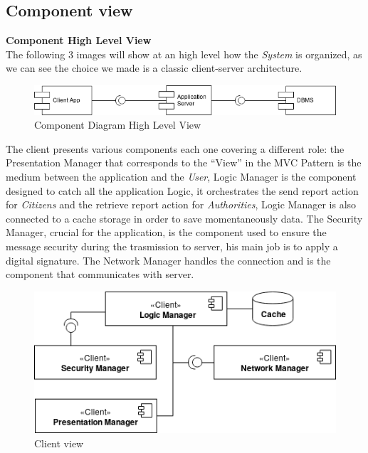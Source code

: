 \documentclass{article}
\begin{document}
\clearpage
\subsection{Component view}
\textbf{Component High Level View} \\
The following 3 images will show at an high level how the \textit{System} is organized, as we can see the
choice we made is a classic client-server architecture. 

\begin{figure}[H]
    \centering
    \includegraphics[scale=0.4]{img/component_diagrams/component_diagram.png}
    \caption{Component Diagram High Level View}
\end{figure}
The client presents various components 
each one covering a different role: the Presentation Manager that corresponds to the “View” in the MVC Pattern 
is the medium between the application and the \textit{User}, Logic Manager is the component designed to catch 
all the application Logic, it orchestrates the send report action for \textit{Citizens} and the retrieve report 
action for \textit{Authorities}, Logic Manager is also connected to a cache storage in order to save momentaneously 
data. The Security Manager, crucial for the application, is the component used to ensure the message security 
during the trasmission to server, his main job is to apply a digital signature. The Network Manager handles the
connection and is the component that communicates with server.

\begin{figure}[H]
    \centering
    \includegraphics[scale=0.6]{img/component_diagrams/client_component.png}
    \caption{Client view}
\end{figure}
\end{document}
